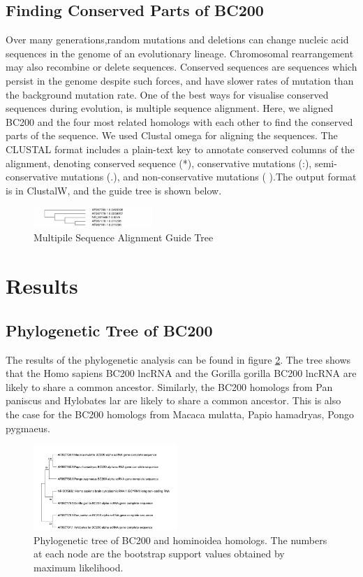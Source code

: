 \documentclass[conference]{IEEEtran}
\begin{document}
\subsection{Finding Conserved Parts of BC200}
Over many generations,random mutations and deletions can change nucleic acid sequences in the genome of an evolutionary lineage. Chromosomal rearrangement may also recombine or delete sequences. Conserved sequences are sequences which persist in the genome despite such forces, and have slower rates of mutation than the background mutation rate\cite{kimura1974some}.
One of the best ways for visualise conserved sequences during evolution, is multiple sequence alignment. Here, we aligned BC200 and the four most related homologs with each other to find the conserved parts of the sequence. We used Clustal omega for aligning the sequences. The CLUSTAL format includes a plain-text key to annotate conserved columns of the alignment, denoting conserved sequence (*), conservative mutations (:), semi-conservative mutations (.), and non-conservative mutations ( ).The output format is in ClustalW, and the guide tree is shown below.


\begin{figure}[h]
  \centering
  \label{fig:Guide-tree}
  \includegraphics[width=0.4\textwidth]{figs/guidetree.png}
  \caption{Multipile Sequence Alignment Guide Tree}
\end{figure}

\section{Results}\label{sec:results}

\subsection{Phylogenetic Tree of BC200}
The results of the phylogenetic analysis can be found in figure \ref{fig:phylo-tree}. 
The tree shows that the Homo sapiens BC200 lncRNA and the Gorilla gorilla BC200 lncRNA are likely to share a common ancestor. 
Similarly, the BC200 homologs from Pan paniscus and Hylobates lar are likely to share a common ancestor. 
This is also the case for the BC200 homologs from Macaca mulatta, Papio hamadryas, Pongo pygmaeus. 

\begin{figure}[h]
  \centering
  \includegraphics[width=0.485\textwidth]{figs/phylogenetic-tree.jpg}
  \caption{Phylogenetic tree of BC200 and hominoidea homologs. The numbers at each node are the bootstrap support values obtained by maximum likelihood.}
  \label{fig:phylo-tree}
\end{figure}
\end{document}
